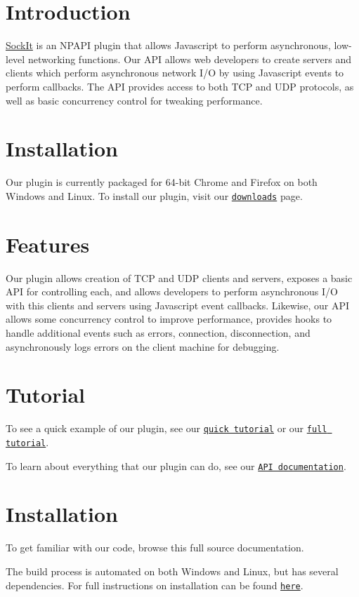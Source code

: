 \hypertarget{index_intro_sec}{}\section{Introduction}\label{index_intro_sec}
\hyperlink{classSockIt}{SockIt} is an NPAPI plugin that allows Javascript to perform asynchronous, low-\/level networking functions. Our API allows web developers to create servers and clients which perform asynchronous network I/O by using Javascript events to perform callbacks. The API provides access to both TCP and UDP protocols, as well as basic concurrency control for tweaking performance.\hypertarget{index_install_sec}{}\section{Installation}\label{index_install_sec}
Our plugin is currently packaged for 64-\/bit Chrome and Firefox on both Windows and Linux. To install our plugin, visit our \href{http://sockit.github.com/sockit/downloads.html}{\tt downloads} page.\hypertarget{index_features_sec}{}\section{Features}\label{index_features_sec}
Our plugin allows creation of TCP and UDP clients and servers, exposes a basic API for controlling each, and allows developers to perform asynchronous I/O with this clients and servers using Javascript event callbacks. Likewise, our API allows some concurrency control to improve performance, provides hooks to handle additional events such as errors, connection, disconnection, and asynchronously logs errors on the client machine for debugging.\hypertarget{index_tutorial_sec}{}\section{Tutorial}\label{index_tutorial_sec}
To see a quick example of our plugin, see our \href{http://sockit.github.com/sockit/tutorial.html}{\tt quick tutorial} or our \href{http://sockit.github.com/sockit/tutorial/full_tutorial.html}{\tt full tutorial}. 

To learn about everything that our plugin can do, see our \href{http://sockit.github.com/sockit/api_documentation.html}{\tt API documentation}.\hypertarget{index_install_sec}{}\section{Installation}\label{index_install_sec}
To get familiar with our code, browse this full source documentation. 

The build process is automated on both Windows and Linux, but has several dependencies. For full instructions on installation can be found \href{../index.html}{\tt here}.  